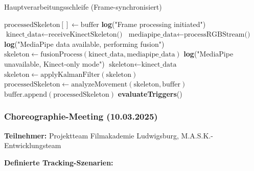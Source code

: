 \begin{algorithm}[H]
\caption{Hauptverarbeitungsschleife (Frame-synchronisiert)}\label{alg:main_processing}
\begin{algorithmic}[1]
    \State $\text{processedSkeleton}[] \leftarrow \text{buffer}$
    \State \textbf{log}("Frame processing initiated")
    \State $\text{kinect\_data} \leftarrow \text{receiveKinectSkeleton()}$
    \State $\text{mediapipe\_data} \leftarrow \text{processRGBStream()}$
        \State \textbf{log}("MediaPipe data available, performing fusion")
        \State $\text{skeleton} \leftarrow \text{fusionProcess}(\text{kinect\_data}, \text{mediapipe\_data})$
    \Else
        \State \textbf{log}("MediaPipe unavailable, Kinect-only mode")
        \State $\text{skeleton} \leftarrow \text{kinect\_data}$
    \EndIf
    \State $\text{skeleton} \leftarrow \text{applyKalmanFilter}(\text{skeleton})$
    \State $\text{processedSkeleton} \leftarrow \text{analyzeMovement}(\text{skeleton}, \text{buffer})$
    \State $\text{buffer.append}(\text{processedSkeleton})$
    \State \textbf{evaluateTriggers}()
\end{algorithmic}
\end{algorithm}

\subsubsection{Choreographie-Meeting (10.03.2025)}

\textbf{Teilnehmer:} Projektteam Filmakademie Ludwigsburg, M.A.S.K.-Entwicklungsteam

\textbf{Definierte Tracking-Szenarien:}

